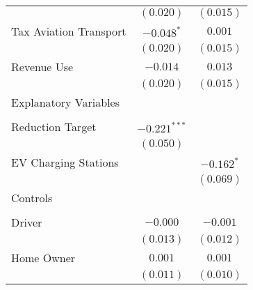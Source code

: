 \begin{center}
\begin{tiny}
\begin{longtable}{l@{} c@{} c@{}}
                                                                           & $(0.020)$       & $(0.015)$      \\
\quad Tax Aviation Transport                                               & $-0.048^{*}$    & $0.001$        \\
                                                                           & $(0.020)$       & $(0.015)$      \\
\quad Revenue Use                                                          & $-0.014$        & $0.013$        \\
                                                                           & $(0.020)$       & $(0.015)$      \\
Explanatory Variables                                                      &                 &                \\
                                                                           &                 &                \\
\quad Reduction Target                                                     & $-0.221^{***}$  &                \\
                                                                           & $(0.050)$       &                \\
\quad EV Charging Stations                                                 &                 & $-0.162^{*}$   \\
                                                                           &                 & $(0.069)$      \\
Controls                                                                   &                 &                \\
                                                                           &                 &                \\
\quad Driver                                                               & $-0.000$        & $-0.001$       \\
                                                                           & $(0.013)$       & $(0.012)$      \\
\quad Home Owner                                                           & $0.001$         & $0.001$        \\
                                                                           & $(0.011)$       & $(0.010)$      \\

\end{longtable}
\end{tiny}
\end{center}
